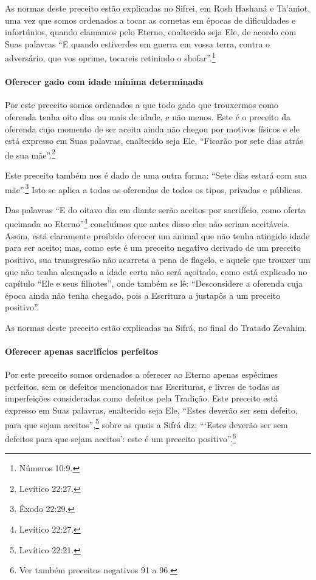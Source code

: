 \begin{multicols}{2}
As normas deste preceito estão explicadas no Sifrei\starr, em Rosh Hashaná\starr{} e
Ta'aniot\starr, uma vez que somos ordenados a tocar as cornetas em épocas de
dificuldades e infortúnios, quando clamamos pelo Eterno, enaltecido
seja Ele, de acordo com Suas palavras ``E quando estiverdes em guerra
em vossa terra, contra o adversário, que vos oprime, tocareis retinindo
o shofar\starr''.\footnote{Números 10:9.}

\paragraph{Oferecer gado com idade mínima determinada}

Por este preceito somos ordenados a que todo gado que trouxermos como
oferenda tenha oito dias ou mais de idade, e não menos. Este é o
preceito da oferenda cujo momento de ser aceita ainda não chegou por
motivos físicos e ele está expresso em Suas palavras, enaltecido seja
Ele, ``Ficarão por sete dias atrás de sua mãe''.\footnote{Levítico 22:27.}

Este preceito também nos é dado de uma outra forma: ``Sete dias estará
com sua mãe''.\footnote{Êxodo 22:29.} Isto se aplica a todas as oferendas de
todos os tipos, privadas e públicas.

Das palavras ``E do oitavo dia em diante serão aceitos por sacrifício,
como oferta queimada ao Eterno''\footnote{Levítico 22:27.} concluímos que antes
disso eles não seriam aceitáveis. Assim, está claramente proibido
oferecer um animal que não tenha atingido idade para ser aceito; mas,
como este é um preceito negativo derivado de um preceito positivo, sua
transgressão não acarreta a pena de flagelo, e aquele que trouxer um que
não tenha alcançado a idade certa não será açoitado, como está explicado
no capítulo ``Ele e seus filhotes'', onde também se lê: ``Desconsidere
a oferenda cuja época ainda não tenha chegado, pois a Escritura a
justapôs a um preceito positivo''.

As normas deste preceito estão explicadas na Sifrá\starr, no final do Tratado
Zevahim\starr.

\paragraph{Oferecer apenas sacrifícios perfeitos}

Por este preceito somos ordenados a oferecer ao Eterno apenas espécimes
perfeitos, sem os defeitos mencionados nas Escrituras, e livres de todas
as imperfeições consideradas como defeitos pela Tradição. Este preceito
está expresso em Suas palavras, enaltecido seja Ele, ``Estes deverão ser
sem defeito, para que sejam aceitos'',\footnote{Levítico 22:21.} sobre as quais a
Sifrá\starr{} diz: ```Estes deverão ser sem defeitos para que sejam aceitos':
este é um preceito positivo''.\footnote{Ver também preceitos negativos 91 a 96.}


\end{multicols}

